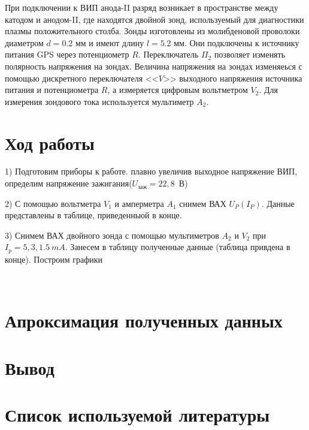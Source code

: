 При подключении к ВИП анода-II разряд возникает в пространстве между катодом и анодом-II, где находятся двойной зонд, используемый для диагностики плазмы положительного столба. Зонды изготовлены из молибденовой проволоки диаметром $d = 0.2$ мм и имеют длину $l = 5.2$ мм. Они подключены к источнику питания GPS через потенциометр $R$. Переключатель $\Pi_2$ позволяет изменять полярность напряжения на зондах. Величина напряжения на зондах изменяеься с помощью дискретного переключателя <<$V$>> выходного напряжения источника питания и потенциометра $R$, а измеряется цифровым вольтметром $V_2$. Для измерения зондового тока используется мультиметр $A_2$.


\section{{Ход работы}}

1) Подготовим приборы к работе. плавно увеличив выходное напряжение ВИП, определим напряжение зажигания($U_{\text{заж}} = 22,8$\ В)

2) С помощью вольтметра $V_1$ и амперметра $A_1$ снимем ВАХ $U_P(I_P)$. Данные представлены в таблице, приведенныой в конце.

3) Снимем ВАХ двойного зонда с помощью мультиметров $A_2$ и $V_2$ при $I_p = 5, 3, 1.5\ mA$.
Занесем в таблицу полученные данные (таблица привдена в конце). Построим графики

\begin{figure}[h]
    \centering
    \\
\end{figure}



\section{{Апроксимация полученных данных}}


\section{{Вывод}}


\section{{Список используемой литературы}}

